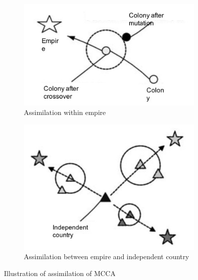 \begin{figure}[h!]
	\centering
	\begin{subfigure}[b]{0.4\linewidth}
		\includegraphics[width=\linewidth]{sections/figure3a.jpg}
		\caption{Assimilation within empire}
	\end{subfigure}
	\begin{subfigure}[b]{0.4\linewidth}
		\includegraphics[width=\linewidth]{sections/figure3b.jpg}
		\caption{Assimilation between empire and independent country}
	\end{subfigure}
	\caption{Illustration of assimilation of MCCA}
	\label{fig:fig3}
\end{figure}


